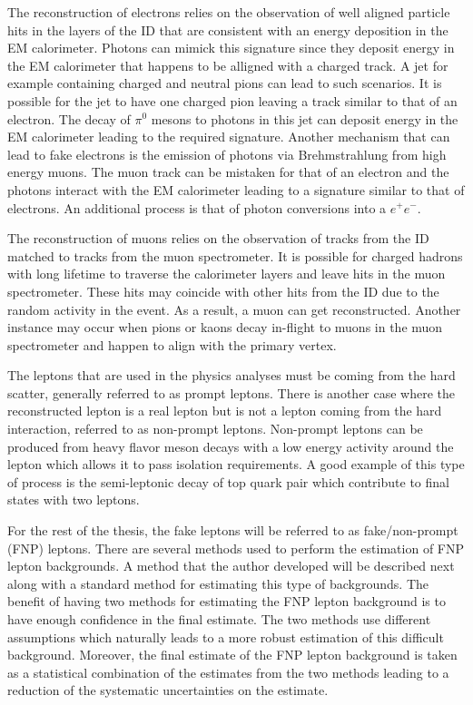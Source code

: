 The reconstruction of electrons relies on the observation of well aligned particle hits in the layers of the ID that are consistent 
with an energy deposition in the EM calorimeter. Photons can mimick this signature since they deposit energy in the EM 
calorimeter that happens to be alligned with a charged track. A jet for example containing charged and neutral pions can 
lead to such scenarios. It is possible for the jet to have one charged pion leaving a track similar to that of an electron.
The decay of $\pi^0$ mesons to photons in this jet can deposit energy in the EM calorimeter leading to the required signature.
Another mechanism that can lead to fake electrons is the emission of photons via Brehmstrahlung from high energy muons. 
The muon track can be mistaken for that of an electron and the photons interact with the EM calorimeter leading to a
signature similar to that of electrons. An additional process is that of photon conversions into a $e^+e^-$.

The reconstruction of muons relies on the observation of tracks from the ID matched to tracks from the muon spectrometer.
It is possible for charged hadrons with long lifetime to traverse the calorimeter layers and leave hits in the muon spectrometer.
These hits may coincide with other hits from the ID due to the random activity in the event. As a result, a muon can get
reconstructed. Another instance may occur when pions or kaons decay in-flight to muons in the muon spectrometer
and happen to align with the primary vertex.

The leptons that are used in the physics analyses must be coming from the hard scatter, generally referred to as prompt leptons.
There is another case where the reconstructed lepton is a real lepton but is not a lepton coming from the hard interaction,
referred to as non-prompt leptons. Non-prompt leptons can be produced from heavy flavor meson decays with a low energy activity 
around the lepton which allows it to pass isolation requirements. A good example of this type of process is the 
semi-leptonic decay of top quark pair which contribute to final states with two leptons. 

For the rest of the thesis, the fake leptons will be referred to as fake/non-prompt (FNP) leptons.
There are several methods used to perform the estimation of FNP lepton backgrounds. 
A method that the author developed will be described next along with a standard method for estimating this type of backgrounds.
The benefit of having two methods for estimating the FNP lepton background is to have enough confidence in the final estimate. 
The two methods use different assumptions which naturally leads to a more robust estimation of this difficult background.
Moreover, the final estimate of the FNP lepton background is taken as a statistical combination of the estimates from the 
two methods leading to a reduction of the systematic uncertainties on the estimate.


